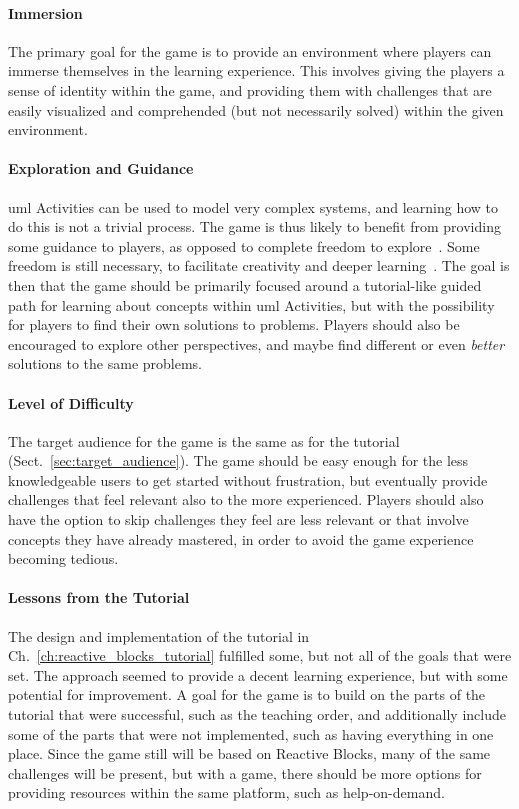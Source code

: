 \paragraph{Immersion} The primary goal for the game is to provide an environment where players can immerse themselves in the learning experience. This involves giving the players a sense of identity within the game, and providing them with challenges that are easily visualized and comprehended (but not necessarily solved) within the given environment.

\paragraph{Exploration and Guidance} \gls{uml} Activities can be used to model very complex systems, and learning how to do this is not a trivial process. The game is thus likely to benefit from providing some guidance to players, as opposed to complete freedom to explore~\cite{andersen:tutorials_impact}. Some freedom is still necessary, to facilitate creativity and deeper learning~\cite{bonawitz:double_edged_pedagogy}. The goal is then that the game should be primarily focused around a tutorial-like guided path for learning about concepts within \gls{uml} Activities, but with the possibility for players to find their own solutions to problems. Players should also be encouraged to explore other perspectives, and maybe find different or even \emph{better} solutions to the same problems.

\paragraph{Level of Difficulty} The target audience for the game is the same as for the tutorial (Sect.~\ref{sec:target_audience}). The game should be easy enough for the less knowledgeable users to get started without frustration, but eventually provide challenges that feel relevant also to the more experienced. Players should also have the option to skip challenges they feel are less relevant or that involve concepts they have already mastered, in order to avoid the game experience becoming tedious.

\paragraph{Lessons from the Tutorial} The design and implementation of the tutorial in Ch.~\ref{ch:reactive_blocks_tutorial} fulfilled some, but not all of the goals that were set. The approach seemed to provide a decent learning experience, but with some potential for improvement. A goal for the game is to build on the parts of the tutorial that were successful, such as the teaching order, and additionally include some of the parts that were not implemented, such as having everything in one place. Since the game still will be based on Reactive Blocks, many of the same challenges will be present, but with a game, there should be more options for providing resources within the same platform, such as help-on-demand.


